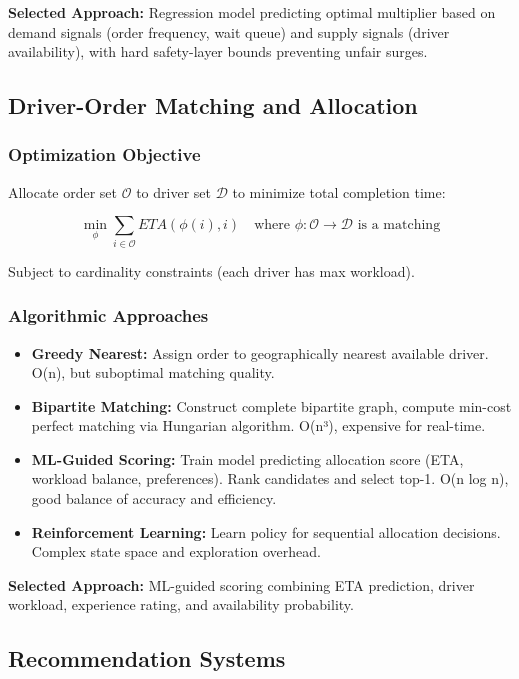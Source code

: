 \documentclass[12pt,a4paper]{report}
\begin{document}
\textbf{Selected Approach:} Regression model predicting optimal multiplier based on demand signals (order frequency, wait queue) and supply signals (driver availability), with hard safety-layer bounds preventing unfair surges.

\subsection{Driver-Order Matching and Allocation}

\subsubsection{Optimization Objective}

Allocate order set $\mathcal{O}$ to driver set $\mathcal{D}$ to minimize total completion time:

$$\min_{\phi} \sum_{i \in \mathcal{O}} ETA(\phi(i), i) \quad \text{where } \phi: \mathcal{O} \to \mathcal{D} \text{ is a matching}$$

Subject to cardinality constraints (each driver has max workload).

\subsubsection{Algorithmic Approaches}

\begin{itemize}
    \item \textbf{Greedy Nearest:} Assign order to geographically nearest available driver. O(n), but suboptimal matching quality.
    \item \textbf{Bipartite Matching:} Construct complete bipartite graph, compute min-cost perfect matching via Hungarian algorithm. O(n³), expensive for real-time.
    \item \textbf{ML-Guided Scoring:} Train model predicting allocation score (ETA, workload balance, preferences). Rank candidates and select top-1. O(n log n), good balance of accuracy and efficiency.
    \item \textbf{Reinforcement Learning:} Learn policy for sequential allocation decisions. Complex state space and exploration overhead.
\end{itemize}

\textbf{Selected Approach:} ML-guided scoring combining ETA prediction, driver workload, experience rating, and availability probability.

\subsection{Recommendation Systems}
\end{document}
